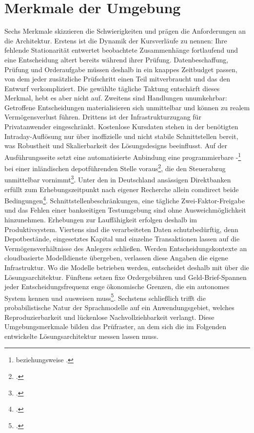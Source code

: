 \section{Merkmale der Umgebung}
\label{sec:umgebungsmerkmale}

Sechs Merkmale skizzieren die Schwierigkeiten und
prägen die Anforderungen an die Architektur. Erstens ist die Dynamik der Kursverläufe zu nennen:
Ihre fehlende Stationarität entwertet beobachtete Zusammenhänge fortlaufend und eine
Entscheidung altert bereits während ihrer Prüfung. Datenbeschaffung, Prüfung und
Orderaufgabe müssen deshalb in ein knappes Zeitbudget passen, von dem jeder zusätzliche Prüfschritt einen Teil mitverbraucht und das den Entwurf verkompliziert. Die gewählte tägliche Taktung entschärft dieses Merkmal, hebt es aber nicht auf. Zweitens sind Handlungen unumkehrbar: Getroffene Entscheidungen materialisieren sich unmittelbar und können zu realem Vermögensverlust führen. Drittens ist der Infrastrukturzugang für Privatanwender
eingeschränkt. Kostenlose Kursdaten stehen in der benötigten Intraday-Auflösung nur
über inoffizielle und nicht stabile Schnittstellen bereit, was Robustheit und
Skalierbarkeit des Lösungsdesigns beeinflusst. Auf der Ausführungsseite setzt eine
automatisierte Anbindung eine programmierbare
-\footnote{ beziehungsweise
.} bei einer inländischen depotführenden Stelle
voraus\footcites[vgl.][]{comdirectApi2026}[vgl.][Kap.~7, S.~38--47]{comdirectSpec2020},
die den Steuerabzug unmittelbar vornimmt\footcite[vgl.][\S~44 Abs.~1]{estg44}. Unter
den in Deutschland ansässigen Direktbanken erfüllt zum Erhebungszeitpunkt nach eigener Recherche allein
comdirect beide Bedingungen\footcite[Eigene Recherche, Stand 19.07.2026. Bei nicht in
Deutschland ansässigen Anbietern entfällt der Abzug, die Veranlagung obliegt dann dem
Anleger, vgl.][\S~32d Abs.~3]{estg32d}. Schnittstellenbeschränkungen, eine tägliche Zwei-Faktor-Freigabe und das Fehlen einer bankseitigen Testumgebung sind ohne
Ausweichmöglichkeit hinzunehmen. Erhebungen zur Lauffähigkeit erfolgen deshalb im
Produktivsystem.
Viertens sind die verarbeiteten Daten schutzbedürftig, denn
Depotbestände, eingesetztes Kapital und einzelne Transaktionen lassen auf die
Vermögensverhältnisse des Anlegers schließen. Werden Entscheidungskontexte an
cloudbasierte Modelldienste übergeben, verlassen diese Angaben die eigene
Infrastruktur. Wo die Modelle betrieben werden, entscheidet deshalb mit über die Lösungsarchitektur. Fünftens
setzen fixe Ordergebühren und Geld-Brief-Spannen jeder Entscheidungsfrequenz enge
ökonomische Grenzen, die ein autonomes System kennen und ausweisen
muss\footcite[vgl.][S.~9]{comdirectPreise2026}. Sechstens
schließlich trifft die probabilistische Natur der Sprachmodelle auf ein
Anwendungsgebiet, welches Reproduzierbarkeit und lückenlose Nachvollziehbarkeit
verlangt. Diese Umgebungsmerkmale bilden das Prüfraster, an dem sich die im
Folgenden entwickelte Lösungsarchitektur messen lassen muss.

